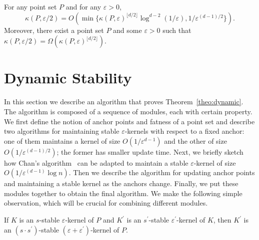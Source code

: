 \documentclass[11pt]{myclass}
\newcommand{\eps}{\varepsilon}
\newcommand{\opt}[2]{\kappa(#1,#2)}
\begin{document}
\begin{theorem}
\label{theo:approx}
    For any point set $P$ and for any $\eps>0$, 
    $$\opt{P}{\eps/2} = O(
	\min \{ \opt{P}{\eps}^{\lfloor d/2 \rfloor} \log
		^{d-2} (1/\eps), 1/\eps^{(d-1)/2} \}).$$
Moreover, there exist a point set $P$ and some $\eps>0$ such that 
   $\opt{P}{\eps/2} =\Omega (\opt{P}{\eps}^{\lfloor d/2 \rfloor})$.
\end{theorem}


\section{Dynamic Stability}
\label{sec:dynamic}

In this section we describe an algorithm that proves 
Theorem~\ref{theo:dynamic}. The algorithm is composed of a sequence of 
modules, each with certain property.  
We first define the notion of anchor points and fatness of a 
point set and describe two algorithms for maintaining 
stable $\eps$-kernels with respect to a fixed anchor:
one of them maintains a kernel of size $O(1/\eps^{d-1})$ and the other 
of size $O(1/\eps^{(d-1)/2})$; the former has smaller update time.
Next, we briefly sketch how Chan's algorithm~\cite{Cha08} can be adapted to maintain a stable $\eps$-kernel of size $O(1/\eps^{(d-1)}\log n)$. 
Then we describe the algorithm for updating anchor points and 
maintaining a stable kernel as the anchors change. Finally, we put these 
modules together to obtain the final algorithm.
We make the following simple observation, which will be crucial for combining different modules.

\begin{lemma}
If $K$ is an $s$-stable $\eps$-kernel of $P$ and $K^\prime$ is an $s^\prime$-stable $\eps^\prime$-kernel of $K$, then $K^\prime$ is an $(s \cdot s^\prime)$-stable $(\eps + \eps^\prime)$-kernel of $P$.
\label{lem:chain}
\end{lemma}
\end{document}
